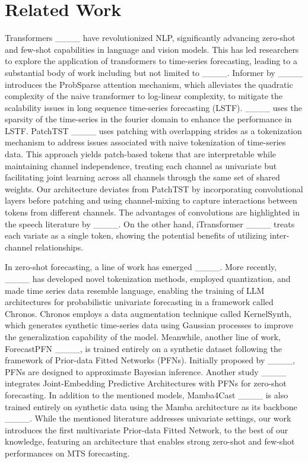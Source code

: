 \section{Related Work}
\label{sec:related}



Transformers ____ have revolutionized NLP, significantly advancing zero-shot and few-shot capabilities in language and vision models. This has led researchers to explore the application of transformers to time-series forecasting, leading to a substantial body of work including but not limited to ____.  Informer by ____ introduces the ProbSparse attention mechanism, which alleviates the quadratic complexity of the naive transformer to log-linear complexity, to mitigate the scalability issues in long sequence time-series forecasting (LSTF). ____ uses the sparsity of the time-series in the fourier domain to enhance the performance in LSTF. PatchTST ____ uses patching with overlapping strides as a tokenization mechanism to address issues associated with naive tokenization of time-series data. This approach yields patch-based tokens that are interpretable while maintaining channel independence, treating each channel as univariate but facilitating joint learning across all channels through the same set of shared weights. Our architecture deviates from PatchTST by incorporating convolutional layers before patching and using channel-mixing to capture interactions between tokens from different channels. The advantages of convolutions are highlighted in the speech literature by ____. On the other hand, iTransformer ____ treats each variate as a single token, showing the potential benefits of utilizing inter-channel relationships.


In zero-shot forecasting, a line of work has emerged ____. More recently, ____ has developed novel tokenization methods, employed quantization, and made time series data resemble language, enabling the training of LLM architectures for probabilistic univariate forecasting in a framework called Chronos. Chronos employs a data augmentation technique called KernelSynth, which generates synthetic time-series data using Gaussian processes to improve the generalization capability of the model. Meanwhile, another line of work, ForecastPFN ____, is trained entirely on a synthetic dataset following the framework of Prior-data Fitted Networks (PFNs). Initially proposed by ____, PFNs are designed to approximate Bayesian inference. Another study ____ integrates Joint-Embedding Predictive Architectures with PFNs for zero-shot forecasting. In addition to the mentioned models, Mamba4Cast ____ is also trained entirely on synthetic data using the Mamba architecture as its backbone ____. While the mentioned literature addresses univariate settings, our work introduces the first multivariate Prior-data Fitted Network, to the best of our knowledge, featuring an architecture that enables strong zero-shot and few-shot performances on MTS forecasting. 

